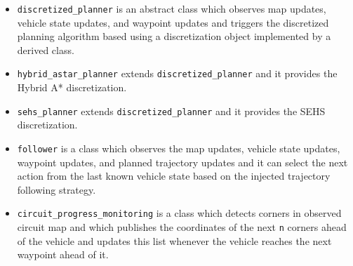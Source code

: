 \begin{itemize}
	\item \texttt{discretized\_planner} is an abstract class which observes map updates, vehicle state updates, and waypoint updates and triggers the discretized planning algorithm based using a discretization object implemented by a derived class.
	\item \texttt{hybrid\_astar\_planner} extends \texttt{discretized\_planner} and it provides the Hybrid A* discretization.
	\item \texttt{sehs\_planner} extends \texttt{discretized\_planner} and it provides the \gls{SEHS} discretization.
	\item \texttt{follower} is a class which observes the map updates, vehicle state updates, waypoint updates, and planned trajectory updates and it can select the next action from the last known vehicle state based on the injected trajectory following strategy.
	\item \texttt{circuit\_progress\_monitoring} is a class which detects corners in observed circuit map and which publishes the coordinates of the next \texttt{n} corners ahead of the vehicle and updates this list whenever the vehicle reaches the next waypoint ahead of it.
\end{itemize}